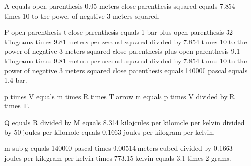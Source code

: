 A equals open parenthesis 0.05 meters close parenthesis squared equals 7.854 times 10 to the power of negative 3 meters squared.

P open parenthesis t close parenthesis equals 1 bar plus open parenthesis 32 kilograms times 9.81 meters per second squared divided by 7.854 times 10 to the power of negative 3 meters squared close parenthesis plus open parenthesis 9.1 kilograms times 9.81 meters per second squared divided by 7.854 times 10 to the power of negative 3 meters squared close parenthesis equals 140000 pascal equals 1.4 bar.

p times V equals m times R times T arrow m equals p times V divided by R times T.

Q equals R divided by M equals 8.314 kilojoules per kilomole per kelvin divided by 50 joules per kilomole equals 0.1663 joules per kilogram per kelvin.

m sub g equals 140000 pascal times 0.00514 meters cubed divided by 0.1663 joules per kilogram per kelvin times 773.15 kelvin equals 3.1 times 2 grams.